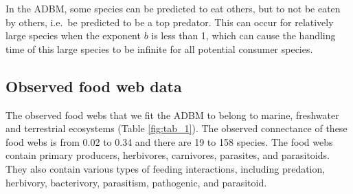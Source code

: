 \documentclass{article}
\begin{document}
\begin{table}

\caption{\label{tab:unnamed-chunk-2}\label{fig:tab_2}Traits with their allometric function and corresponding parameters in ADBM.}
\centering
{}
\end{table}

In the ADBM, some species can be predicted to eat others, but to not be
eaten by others, i.e.~be predicted to be a top predator. This can occur
for relatively large species when the exponent \(b\) is less than 1,
which can cause the handling time of this large species to be infinite
for all potential consumer species.

\hypertarget{observed-food-web-data}{%
\subsection{Observed food web data}\label{observed-food-web-data}}

The observed food webs that we fit the ADBM to belong to marine,
freshwater and terrestrial ecosystems (Table \ref{fig:tab_1}). The
observed connectance of these food webs is from 0.02 to 0.34 and there
are 19 to 158 species. The food webs contain primary producers,
herbivores, carnivores, parasites, and parasitoids. They also contain
various types of feeding interactions, including predation, herbivory,
bacterivory, parasitism, pathogenic, and parasitoid.
\end{document}
